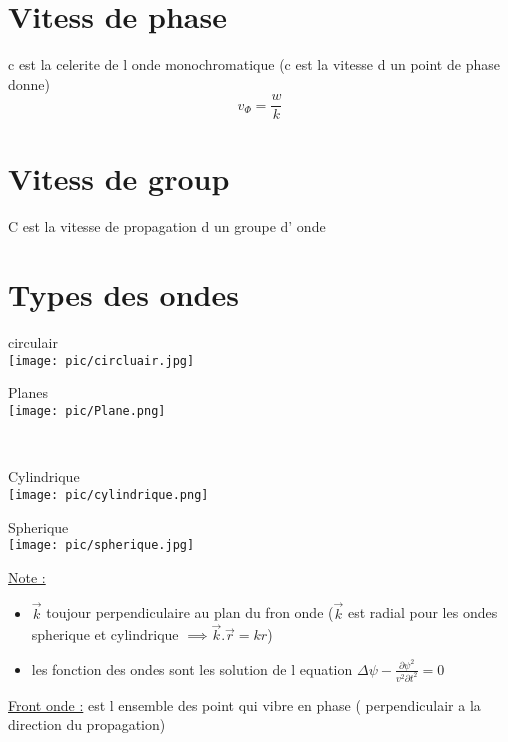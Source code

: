 \documentclass[12pt]{book}
\begin{document}
        \section{Vitess de phase}
            c est la celerite de l onde monochromatique  (c est la vitesse d un point de phase donne)
            \[v_\varPhi = \frac{w}{k}\]
        \section{Vitess de group}
            C est la vitesse de propagation d un groupe d' onde 
        \section{Types des ondes}
            \begin{minipage}{0.49\linewidth}
                circulair \\
                \texttt{[image: pic/circluair.jpg]}
            \end{minipage}
            \begin{minipage}{0.49\linewidth}
                Planes \\
                \texttt{[image: pic/Plane.png]}
            \end{minipage}\\
            \begin{minipage}{0.49\linewidth}
                Cylindrique \\
                \texttt{[image: pic/cylindrique.png]}
            \end{minipage}
            \begin{minipage}{0.49\linewidth}
                Spherique \\
                \texttt{[image: pic/spherique.jpg]}
            \end{minipage}
            
            \underline{Note :} 
                \begin{itemize}
                    \item $\vec{k}$ toujour perpendiculaire au plan du fron onde ($\vec{k}$ est radial pour les ondes spherique et cylindrique $\implies \vec{k}.\vec{r}=kr$) 
                    \item les fonction des ondes sont les solution de l equation $\Delta \psi - \frac{\partial \psi^2}{v^2 \partial t^2} =0$ 
                \end{itemize}
            \underline{Front onde :} est l ensemble des point qui vibre en phase ( perpendiculair a la direction du propagation)
\end{document}
